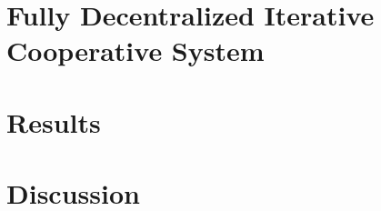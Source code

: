 \documentclass[aspectratio=169]{beamer}
\begin{document}
\section{Fully Decentralized Iterative Cooperative System}

\section{Results}

\section{Discussion}
\end{document}
